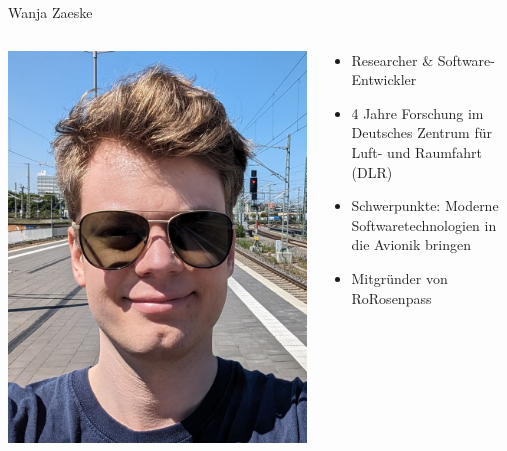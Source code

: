 \begin{frame}{Wanja Zaeske}
  \begin{columns}[fullwidth,c]
    \begin{column}{.3\linewidth}
      \includegraphics[width=.92\linewidth]{graphics/wanja-zaeske.png}
    \end{column}
    \begin{column}{.7\linewidth}
      \begin{itemize}
        \item Researcher \& Software-Entwickler
        \item 4 Jahre Forschung im Deutsches Zentrum für Luft- und Raumfahrt (DLR)
        \item Schwerpunkte: Moderne Softwaretechnologien in die Avionik bringen
        \item Mitgründer von RoRosenpass
      \end{itemize}
    \end{column}%
  \end{columns}
\end{frame}

